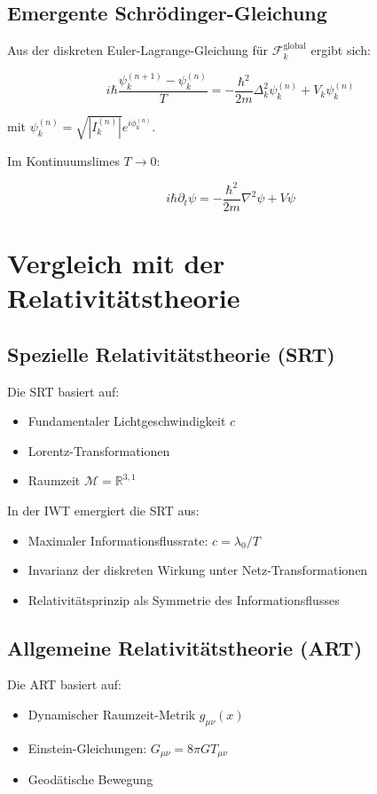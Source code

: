 \subsection{Emergente Schrödinger-Gleichung}

Aus der diskreten Euler-Lagrange-Gleichung für \( \mathcal{F}_k^{\text{global}} \) ergibt sich:

\[
i\hbar \frac{\psi_k^{(n+1)} - \psi_k^{(n)}}{T} = -\frac{\hbar^2}{2m} \Delta_k^2 \psi_k^{(n)} + V_k \psi_k^{(n)}
\]

mit \( \psi_k^{(n)} = \sqrt{|I_k^{(n)}|} e^{i\phi_k^{(n)}} \).

Im Kontinuumslimes \( T \to 0 \):

\[
i\hbar \partial_t \psi = -\frac{\hbar^2}{2m} \nabla^2 \psi + V \psi
\]

\section{Vergleich mit der Relativitätstheorie}

\subsection{Spezielle Relativitätstheorie (SRT)}

Die SRT basiert auf:
\begin{itemize}
\item Fundamentaler Lichtgeschwindigkeit \( c \)
\item Lorentz-Transformationen
\item Raumzeit \( \mathcal{M} = \mathbb{R}^{3,1} \)
\end{itemize}

In der IWT emergiert die SRT aus:
\begin{itemize}
\item Maximaler Informationsflussrate: \( c = \lambda_0/T \)
\item Invarianz der diskreten Wirkung unter Netz-Transformationen
\item Relativitätsprinzip als Symmetrie des Informationsflusses
\end{itemize}

\subsection{Allgemeine Relativitätstheorie (ART)}

Die ART basiert auf:
\begin{itemize}
\item Dynamischer Raumzeit-Metrik \( g_{\mu\nu}(x) \)
\item Einstein-Gleichungen: \( G_{\mu\nu} = 8\pi G T_{\mu\nu} \)
\item Geodätische Bewegung
\end{itemize}

